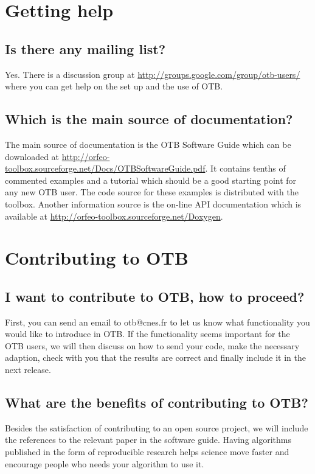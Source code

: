 \section{Getting help}
\subsection{Is there any mailing list?}
Yes. There is a discussion group at
\url{http://groups.google.com/group/otb-users/} where you can get help
on the set up and the use of OTB.

\subsection{Which is the main source of documentation?}
The main source of documentation is the OTB Software Guide which can
be downloaded at
\url{http://orfeo-toolbox.sourceforge.net/Docs/OTBSoftwareGuide.pdf}. It
contains tenths of commented examples and a tutorial which should be a good starting
point for any new OTB user. The code source for these examples is
distributed with the toolbox. Another information source is the
on-line API documentation which is available at \url{http://orfeo-toolbox.sourceforge.net/Doxygen}.

\section{Contributing to OTB}

\subsection{I want to contribute to OTB, how to proceed?}

First, you can send an email to otb@cnes.fr to let us know what functionality 
you would like to introduce in OTB. If the functionality seems important for the 
OTB users, we will then discuss on how to send your code,
make the necessary adaption, check with you that the results are correct and finally
include it in the next release.

\subsection{What are the benefits of contributing to OTB?}

Besides the satisfaction of contributing to an open source project, we will include
the references to the relevant paper in the software guide. Having algorithms
published in the form of reproducible research helps science move faster and 
encourage people who needs your algorithm to use it.

